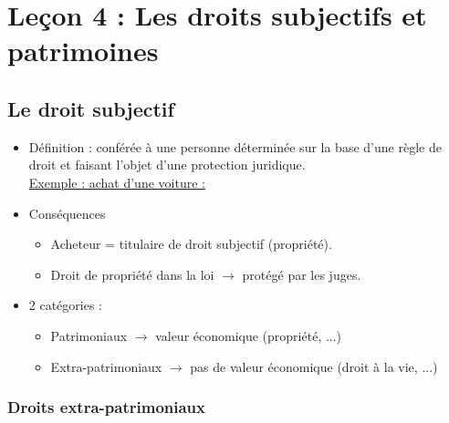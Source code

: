 \newpage
\chapter{Leçon 4 : Les droits subjectifs et patrimoines}

\section{Le droit subjectif}

\begin{itemize}
    \item Définition :  conférée à une personne déterminée sur la base d'une règle de droit et faisant l'objet d'une protection juridique. \\
    \underline{Exemple : achat d'une voiture :}
	\item Conséquences
    \begin{itemize}
        \item Acheteur = titulaire de droit subjectif (propriété).
        \item Droit de propriété dans la loi $\rightarrow$ protégé par les juges.
    \end{itemize}
    \item 2 catégories :
    \begin{itemize}
        \item Patrimoniaux $\rightarrow$ valeur économique (propriété, ...)
        \item Extra-patrimoniaux $\rightarrow$ pas de valeur économique (droit à la vie, ...)
    \end{itemize}
\end{itemize}

\subsection{Droits extra-patrimoniaux}

